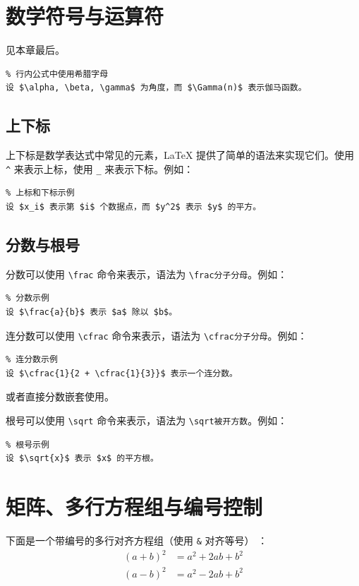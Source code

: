 \section{数学符号与运算符}
见本章最后。
\begin{lstlisting}
% 行内公式中使用希腊字母
设 $\alpha, \beta, \gamma$ 为角度，而 $\Gamma(n)$ 表示伽马函数。
\end{lstlisting}
\subsection{上下标}
上下标是数学表达式中常见的元素，LaTeX 提供了简单的语法来实现它们。使用 \texttt{\^} 来表示上标，使用 \texttt{\_} 来表示下标。例如：
\begin{lstlisting}
% 上标和下标示例
设 $x_i$ 表示第 $i$ 个数据点，而 $y^2$ 表示 $y$ 的平方。
\end{lstlisting}

\subsection{分数与根号}
分数可以使用 \texttt{\textbackslash frac} 命令来表示，语法为 \texttt{\textbackslash frac{分子}{分母}}。例如：
\begin{lstlisting}
% 分数示例
设 $\frac{a}{b}$ 表示 $a$ 除以 $b$。
\end{lstlisting}
\begin{mybox}
	连分数可以使用 \texttt{\textbackslash cfrac} 命令来表示，语法为 \texttt{\textbackslash cfrac{分子}{分母}}。例如：
\begin{lstlisting}
% 连分数示例
设 $\cfrac{1}{2 + \cfrac{1}{3}}$ 表示一个连分数。
\end{lstlisting}
或者直接分数嵌套使用。
\end{mybox}
根号可以使用 \texttt{\textbackslash sqrt} 命令来表示，语法为 \texttt{\textbackslash sqrt{被开方数}}。例如：
\begin{lstlisting}
% 根号示例
设 $\sqrt{x}$ 表示 $x$ 的平方根。
\end{lstlisting}




\section{矩阵、多行方程组与编号控制}
下面是一个带编号的多行对齐方程组（使用 \texttt{\&} 对齐等号） ：
\begin{equation}
\begin{aligned}
    (a+b)^2 &= a^2 + 2ab + b^2 \\
    (a-b)^2 &= a^2 - 2ab + b^2
\end{aligned}
\end{equation}


